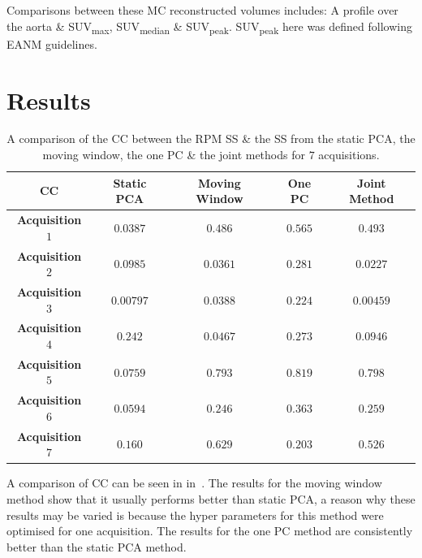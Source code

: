             Comparisons between these \gls{MC} reconstructed volumes includes: A profile over the aorta \& \gls{SUV}\textsubscript{max}, \gls{SUV}\textsubscript{median} \& \gls{SUV}\textsubscript{peak}. \gls{SUV}\textsubscript{peak} here was defined following \gls{EANM} guidelines.%
        
\section{Results} \label{sec:results}
    \begin{table}
        \centering
        \captionsetup{singlelinecheck=false, justification=centering}
        \caption{A comparison of the \gls{CC} between the \gls{RPM} \gls{SS} \& the \gls{SS} from the static \gls{PCA}, the moving window, the one \gls{PC} \& the joint methods for $7$ acquisitions.}
        
        \resizebox*{0.75\linewidth}{!}
        {
            \begin{tabular}{||c|cccc||}
                \hline
                \textbf{\gls{CC}} & \textbf{Static \gls{PCA}} & \textbf{Moving Window} & \textbf{One \gls{PC}} & \textbf{Joint Method} \\
                \hline
                \textbf{Acquisition $1$}   & $0.0387$  & $0.486$  & $0.565$  & $0.493$   \\
                \textbf{Acquisition $2$}   & $0.0985$  & $0.0361$ & $0.281$  & $0.0227$  \\
                \textbf{Acquisition $3$}   & $0.00797$ & $0.0388$ & $0.224$  & $0.00459$ \\
                \textbf{Acquisition $4$}   & $0.242$   & $0.0467$ & $0.273$  & $0.0946$  \\
                \textbf{Acquisition $5$}   & $0.0759$  & $0.793$  & $0.819$  & $0.798$   \\
                \textbf{Acquisition $6$}   & $0.0594$  & $0.246$  & $0.363$  & $0.259$   \\
                \textbf{Acquisition $7$}   & $0.160$   & $0.629$  & $0.203$  & $0.526$   \\
                \hline
            \end{tabular}
        }
        \label{tab:cross_correlation}
    \end{table}
    
    A comparison of \gls{CC} can be seen in in~. The results for the moving window method show that it usually performs better than static \gls{PCA}, a reason why these results may be varied is because the hyper parameters for this method were optimised for one acquisition. The results for the one \gls{PC} method are consistently better than the static \gls{PCA} method.
    
